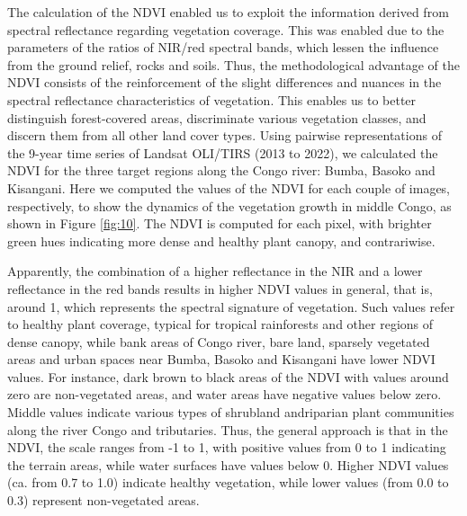 \documentclass[applsci,article,accept,pdftex,moreauthors]{Definitions/mdpi}
\begin{document}
\vspace{6pt}

The calculation of the NDVI enabled us to exploit the information derived from spectral reflectance regarding vegetation coverage. This was enabled due to the parameters of the ratios of NIR/red spectral bands, which lessen the influence from the ground relief, rocks and soils. Thus, the methodological advantage of the NDVI consists of the reinforcement of the slight differences and nuances in the spectral reflectance characteristics of vegetation. This enables us to better distinguish forest-covered areas, discriminate various vegetation classes, and discern them from all other land cover types. Using pairwise representations of the 9-year time series of Landsat OLI/TIRS (2013 to 2022), we calculated the NDVI for the three target regions along the Congo river: Bumba, Basoko and Kisangani. Here we computed the values of the NDVI for each couple of images, respectively, to show the dynamics of the vegetation growth in middle Congo, as shown in Figure \ref{fig:10}. The NDVI is computed for each pixel, with brighter green hues indicating more dense and healthy plant canopy, and contrariwise. 

Apparently, the combination of a higher reflectance in the NIR and a lower reflectance in the red bands results in higher NDVI values in general, that is, around 1, which represents the spectral signature of vegetation. Such values refer to healthy plant coverage, typical for tropical rainforests and other regions of dense canopy, while bank areas of Congo river, bare land, sparsely vegetated areas and urban spaces near Bumba, Basoko and Kisangani have lower NDVI values. For instance, dark brown to black areas of the NDVI with values around zero are non-vegetated areas, and water areas have negative values below {zero}. Middle values indicate various types of shrubland andriparian plant communities along the river Congo and tributaries. Thus, the general approach is that in the NDVI, the scale ranges from -1 to 1, with positive values from 0 to 1 indicating the terrain areas, while water surfaces have values below 0. Higher NDVI values (ca. from 0.7 to 1.0) indicate healthy vegetation, while lower values (from 0.0 to 0.3) represent non-vegetated areas. 
\end{document}
